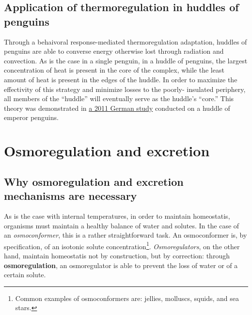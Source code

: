 \documentclass{article}
\begin{document}
\subsection{Application of thermoregulation in huddles of penguins}

Through a behaivoral response-mediated thermoregulation adaptation, huddles of
penguins are able to converse energy otherwise lost through radiation and
convection. As is the case in a single penguin, in a huddle of penguins, the
largest concentration of heat is present in the core of the complex, while the
least amount of heat is present in the edges of the huddle. In order to
maximize the effectivity of this strategy and minimize losses to the poorly-
insulated periphery, all members of the ``huddle'' will eventually serve as the
huddle's ``core.'' This theory was demonstrated in \href{https://www.wired.com/2011/06/penguins-shuffle-warm/}{a 2011 German study}
conducted on a huddle of emperor penguins.

\section{Osmoregulation and excretion}

\subsection{Why osmoregulation and excretion mechanisms are necessary}

As is the case with internal temperatures, in order to maintain homeostatis,
organisms must maintain a healthy balance of water and solutes. In the case of
an \emph{osmoconformer}, this is a rather straightforward task. An osmoconformer
is, by specification, of an isotonic solute concentration\footnote{Common
examples of osmoconformers are: jellies, molluscs, squids, and sea stars.}.
\emph{Osmoregulators}, on the other hand, maintain homeostatis not by
construction, but by correction: through \textbf{osmoregulation}, an
osmoregulator is able to prevent the loss of water or of a certain solute.
\end{document}
